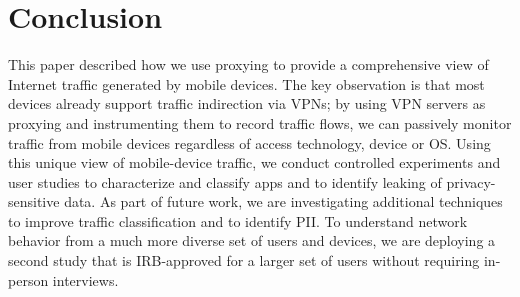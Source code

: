 \section{Conclusion}
\label{sec:conclusion}

This paper described how we use proxying to provide a comprehensive view of Internet traffic 
generated by mobile devices. The key observation is that most devices already support traffic 
indirection via VPNs; by using VPN servers as proxying and instrumenting them to record 
traffic flows, we can passively monitor traffic from mobile devices regardless of access 
technology, device or OS. Using this unique view of mobile-device traffic, we conduct 
controlled experiments and user studies to characterize and classify apps and to identify 
leaking of privacy-sensitive data. As part of future work, we are investigating additional 
techniques to improve traffic classification and to identify PII. To understand network 
behavior from a much more diverse set of users and devices, we are deploying 
a second study that is IRB-approved for a larger set of users without requiring 
in-person interviews. 